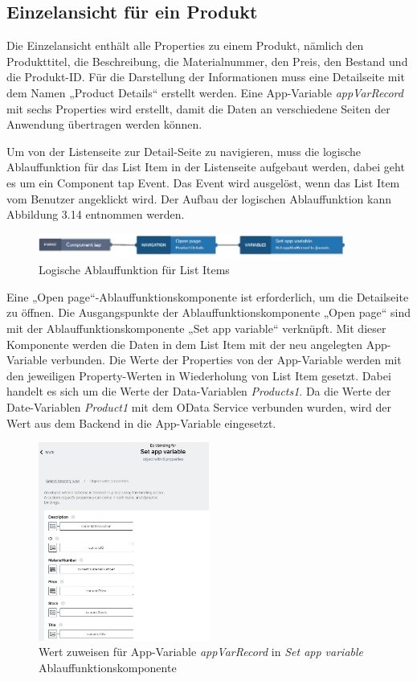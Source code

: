 \subsection{Einzelansicht für ein Produkt}
Die Einzelansicht enthält alle Properties zu einem Produkt, nämlich den Produkttitel, die Beschreibung, die Materialnummer, den Preis, den Bestand und die Produkt-ID. Für die Darstellung der Informationen muss eine Detailseite mit dem Namen „Product Details“ erstellt werden. Eine App-Variable \textit{appVarRecord} mit sechs Properties wird erstellt, damit die Daten an verschiedene Seiten der Anwendung übertragen werden können.

Um von der Listenseite zur Detail-Seite zu navigieren, muss die logische Ablauffunktion für das List Item in der Listenseite aufgebaut werden, dabei geht es um ein Component tap Event. Das Event wird ausgelöst, wenn das List Item vom Benutzer angeklickt wird. Der Aufbau der logischen Ablauffunktion kann Abbildung 3.14 entnommen werden. 
\begin{figure}[htbp]
 \centering
 \includegraphics[width=0.9\textwidth]{Bilder/appgyver/3_14_Logik_ListItem.JPG}
 \caption{Logische Ablauffunktion für List Items}
\end{figure}

Eine „Open page“-Ablauffunktionskomponente ist erforderlich, um die Detailseite zu öffnen. Die Ausgangspunkte der Ablauffunktionskomponente „Open page“ sind mit der Ablauffunktionskomponente „Set app variable“ verknüpft. Mit dieser Komponente werden die Daten in dem List Item mit der neu angelegten App-Variable verbunden. Die Werte der Properties von der App-Variable werden mit den jeweiligen Property-Werten in Wiederholung von List Item gesetzt. Dabei handelt es sich um die Werte der Data-Variablen \textit{Products1}. Da die Werte der Date-Variablen \textit{Product1} mit dem OData Service verbunden wurden, wird der Wert aus dem Backend in die App-Variable eingesetzt.

\begin{figure}[htbp]
 \centering
 \includegraphics[width=0.5\textwidth]{Bilder/appgyver/3_15_set_app_variable.JPG}
 \caption{Wert zuweisen für App-Variable \textit{appVarRecord} in \textit{Set app variable} Ablauffunktionskomponente}
\end{figure}


